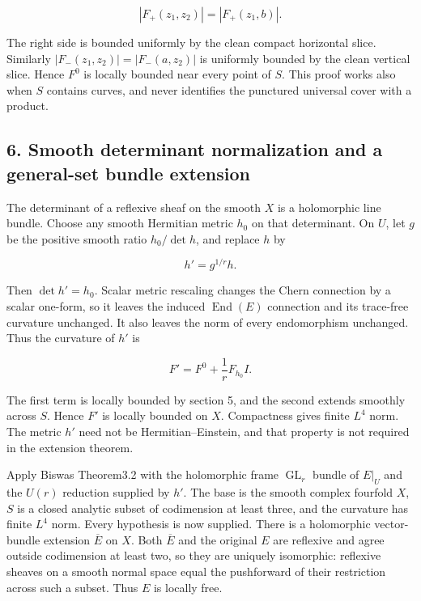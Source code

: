 \[
 |F_+(z_1,z_2)|=|F_+(z_1,b)|.
 \tag{E834.12}
\]

The right side is bounded uniformly by the clean compact horizontal
slice. Similarly
\(|F_-(z_1,z_2)|=|F_-(a,z_2)|\) is uniformly
bounded by the clean vertical slice. Hence \(F^0\) is locally bounded near
every point of \(S\). This proof works also when \(S\) contains curves, and
never identifies the punctured universal cover with a product.

\subsection{6. Smooth determinant normalization and a general-set bundle
extension}\label{SF-E834:smooth-determinant-normalization-and-a-general-set-bundle-extension}

The determinant of a reflexive sheaf on the smooth \(X\) is a holomorphic
line bundle. Choose any smooth Hermitian metric \(h_0\) on that determinant.
On \(U\), let \(g\) be the positive smooth ratio \(h_0/\det h\), and replace \(h\) by

\[
 h'=g^{1/r}h.
 \tag{E834.13}
\]

Then \(\det h'=h_0\). Scalar metric rescaling changes the Chern connection by
a scalar one-form, so it leaves the induced \(\operatorname{End}(E)\) connection and its
trace-free curvature unchanged. It also leaves the norm of every
endomorphism unchanged. Thus the curvature of \(h'\) is

\[
 F'=F^0+\frac1rF_{h_0}I.
 \tag{E834.14}
\]

The first term is locally bounded by section 5, and the second extends
smoothly across \(S\). Hence \(F'\) is locally bounded on \(X\). Compactness gives
finite \(L^4\) norm. The metric \(h'\) need not be Hermitian--Einstein, and
that property is not required in the extension theorem.

Apply Biswas Theorem3.2 with the holomorphic frame \(\operatorname{GL}_r\) bundle of
\(E|_U\) and the \(U(r)\) reduction supplied by \(h'\). The base is the
smooth complex fourfold \(X\), \(S\) is a closed analytic subset of codimension
at least three, and the curvature has finite \(L^4\) norm. Every
hypothesis is now supplied. There is a holomorphic vector-bundle
extension \(\overline E\) on \(X\). Both \(\overline E\) and the original \(E\) are reflexive and
agree outside codimension at least two, so they are uniquely isomorphic:
reflexive sheaves on a smooth normal space equal the pushforward of
their restriction across such a subset. Thus \(E\) is locally free.

